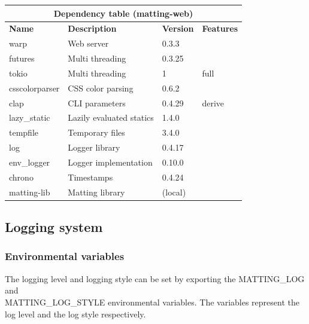 \documentclass[a4paper]{article}
\begin{document}
\bgroup{}
\def\arraystretch{1.5}
\begin{center}
    \begin{tabular}{ |p{2cm}|p{4cm}|p{1.5cm}|p{2cm}| }
        \hline
        \multicolumn{4}{|c|}{\textbf{Dependency table (matting-web)}} \\
        \hline
        \textbf{Name} & \textbf{Description} & \textbf{Version} & \textbf{Features} \\
        \hline
        warp & Web server & 0.3.3 & \- \\
        \hline
        futures & Multi threading & 0.3.25 & \- \\
        \hline
        tokio & Multi threading & 1 & full \\
        \hline
        csscolorparser & CSS color parsing & 0.6.2 & \- \\
        \hline
        clap & CLI parameters & 0.4.29 & derive \\
        \hline
        lazy\_static & Lazily evaluated statics & 1.4.0 & \- \\
        \hline
        tempfile & Temporary files & 3.4.0 & \- \\
        \hline
        log & Logger library & 0.4.17 & \- \\
        \hline
        env\_logger & Logger implementation & 0.10.0 & \- \\
        \hline
        chrono & Timestamps & 0.4.24 & \- \\
        \hline
        matting-lib & Matting library & (local) & \- \\
        \hline
    \end{tabular}
\end{center}
\egroup{}

\pagebreak

\subsection{Logging system}

\subsubsection{Environmental variables}

The logging level and logging style can be set
by exporting the \colorbox{gray!10}{MATTING\_LOG} and \\
\colorbox{gray!10}{MATTING\_LOG\_STYLE}
environmental variables. The variables represent the log level
and the log style respectively.
\end{document}
